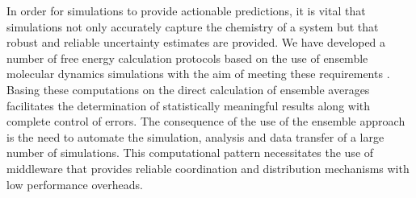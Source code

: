 In order for simulations to provide actionable predictions, it is vital that simulations not only accurately capture the chemistry of a system but that robust and reliable uncertainty estimates are provided.
We have developed a number of free energy calculation protocols based on the use of ensemble molecular dynamics simulations with the aim of meeting these requirements \cite{Sadiq2008, Sadiq2010, Wan2017brd4, Wan2017trk}.
Basing these computations on the direct calculation of ensemble averages facilitates the determination of statistically meaningful results along with complete control of errors.
The consequence of the use of the ensemble approach is the need to automate the simulation, analysis and data transfer of a large number of simulations.
This computational pattern necessitates the use of middleware that provides reliable coordination and distribution mechanisms with low performance overheads.

